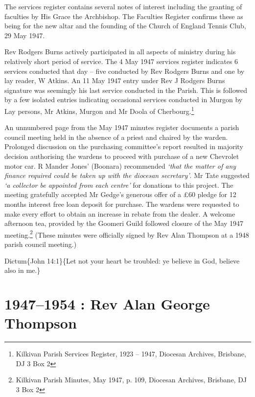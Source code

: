 The services register contains several notes of interest including the granting of faculties by His Grace the Archbishop. The Faculties Register confirms these as being for the new altar and the founding of the Church of England Tennis Club, 29 May 1947.

Rev Rodgers Burns actively participated in all aspects of ministry during his relatively short period of service. The 4 May 1947 services register indicates 6 services conducted that day -- five conducted by Rev Rodgers Burns and one by lay reader, W Atkins. An 11 May 1947 entry under Rev J Rodgers Burns signature was seemingly his last service conducted in the Parish. This is followed by a few isolated entries indicating occasional services conducted in Murgon by Lay persons, Mr Atkins, Murgon and Mr Doola of Cherbourg.\footnote{Kilkivan Parish Services Register, 1923 -- 1947, Diocesan Archives, Brisbane, DJ 3 Box 2}

An unnumbered page from the May 1947 minutes register documents a parish council meeting held in the absence of a priest and chaired by the warden. Prolonged discussion on the purchasing committee's report resulted in majority decision authorising the wardens to proceed with purchase of a new Chevrolet motor car. R Mander Jones' (Boonara) recommended \emph{`that the matter of any finance required could be taken up with the diocesan secretary'}. Mr Tate suggested \emph{`a collector be appointed from each centre'} for donations to this project. The meeting gratefully accepted Mr Gedge's generous offer of a £60 pledge for 12 months interest free loan deposit for purchase. The wardens were requested to make every effort to obtain an increase in rebate from the dealer. A welcome afternoon tea, provided by the Goomeri Guild followed closure of the May 1947 meeting.\footnote{Kilkivan Parish Minutes, May 1947, p. 109, Diocesan Archives, Brisbane, DJ 3 Box 2} (These minutes were officially signed by Rev Alan Thompson at a 1948 parish council meeting.)

Dictum\{John 14:1\}\{Let not your heart be troubled: ye believe in God, believe also in me.\}

\hypertarget{rev-alan-george-thompson}{%
\chapter{1947--1954 : Rev Alan George Thompson}\label{rev-alan-george-thompson}}


